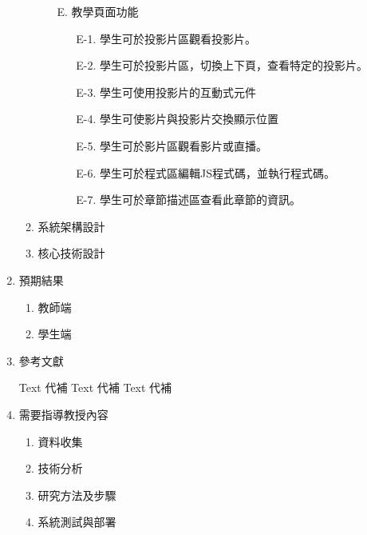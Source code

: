 \documentclass[12pt]{article}
\begin{document}
\begin{enumerate}
\begin{enumerate}
\begin{enumerate}
\begin{enumerate}
            \end{enumerate}
          \item [E.] 教學頁面功能
            \begin{enumerate}
              \item [E-1.] 學生可於投影片區觀看投影片。
              \item [E-2.] 學生可於投影片區，切換上下頁，查看特定的投影片。
              \item [E-3.] 學生可使用投影片的互動式元件
              \item [E-4.] 學生可使影片與投影片交換顯示位置
              \item [E-5.] 學生可於影片區觀看影片或直播。
              \item [E-6.] 學生可於程式區編輯JS程式碼，並執行程式碼。
              \item [E-7.] 學生可於章節描述區查看此章節的資訊。
            \end{enumerate}
          \end{enumerate}

      \item 系統架構設計

      \item 核心技術設計

    \end{enumerate}

  \item 預期結果
    \begin{enumerate}
      \setlength{\parindent}{2em}
      \item 教師端
      \item 學生端
    \end{enumerate}

  \item 參考文獻
    \renewcommand{\section}[2]{}
    \begin{thebibliography}{99}  
       Text 代補
       Text 代補
       Text 代補
    \end{thebibliography} 

  \item 需要指導教授內容
    \begin{enumerate}
      \setlength{\parindent}{2em}
      \item 資料收集
      \item 技術分析
      \item 研究方法及步驟
      \item 系統測試與部署
    \end{enumerate}
\end{enumerate}
\end{document}
